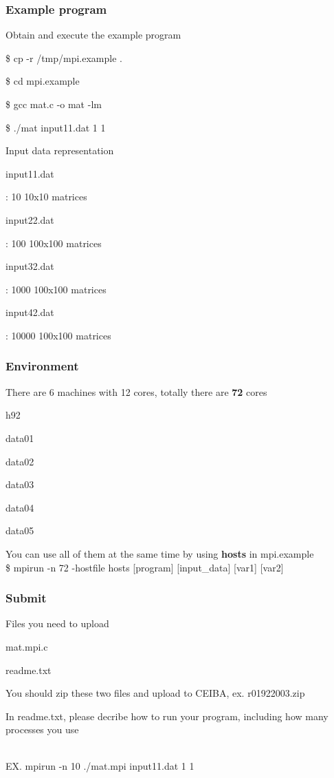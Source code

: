 \documentclass{beamer}
\begin{document}
\begin{frame}
  \frametitle{Example program}
  Obtain and execute the example program
  \begin{itemize}
    {\item \$ cp -r /tmp/mpi.example .}
    {\item \$ cd mpi.example}
    {\item \$ gcc mat.c -o mat -lm}
    {\item \$ ./mat input11.dat 1 1}
  \end{itemize}
  Input data representation
  \begin{itemize}
    {\item input11.dat}: 10 10x10 matrices
    {\item input22.dat}: 100 100x100 matrices
    {\item input32.dat}: 1000 100x100 matrices
    {\item input42.dat}: 10000 100x100 matrices
  \end{itemize}
\end{frame}

\begin{frame}
  \frametitle{Environment}
  There are 6 machines with 12 cores, totally there are {\bf 72} cores
  \begin{itemize}
    {\item h92}
    {\item data01}
    {\item data02}
    {\item data03}
    {\item data04}
    {\item data05}
  \end{itemize}
  You can use all of them at the same time by using {\bf hosts} in mpi.example\\
  \$ mpirun -n 72 -hostfile hosts [program] [input\_data] [var1] [var2]
\end{frame}

\begin{frame}
  \frametitle{Submit}
  \begin{itemize}
    {\item Files you need to upload}
      \begin{itemize}
        {\item mat.mpi.c}
        {\item readme.txt}
      \end{itemize}
    {\item You should zip these two files and upload to CEIBA, ex. r01922003.zip}
    {\item In readme.txt, please decribe how to run your program, including how many processes you use}\\
      EX. mpirun -n 10 ./mat.mpi input11.dat 1 1
  \end{itemize}
\end{frame}
\end{document}
